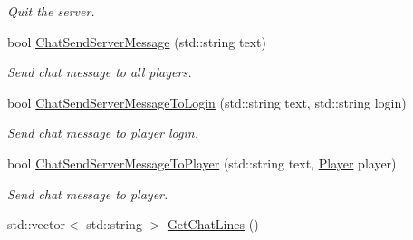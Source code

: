 \begin{DoxyCompactItemize}
\begin{DoxyCompactList}\small\item\em Quit the server. \end{DoxyCompactList}\item 
bool \hyperlink{classMethods_a5e639d7a4fa2e2b403dfa5adfbc47ac3}{Chat\-Send\-Server\-Message} (std\-::string text)
\begin{DoxyCompactList}\small\item\em Send chat message to all players. \end{DoxyCompactList}\item 
bool \hyperlink{classMethods_a200065ea89c2694f9d2af3aae686c483}{Chat\-Send\-Server\-Message\-To\-Login} (std\-::string text, std\-::string login)
\begin{DoxyCompactList}\small\item\em Send chat message to player login. \end{DoxyCompactList}\item 
bool \hyperlink{classMethods_a616887260c024c6b7cabcdca9d43fdec}{Chat\-Send\-Server\-Message\-To\-Player} (std\-::string text, \hyperlink{structPlayer}{Player} player)
\begin{DoxyCompactList}\small\item\em Send chat message to player. \end{DoxyCompactList}\item 
\hypertarget{classMethods_a8a5de3ccd3e56cba116c5c1159c91c11}{std\-::vector$<$ std\-::string $>$ \hyperlink{classMethods_a8a5de3ccd3e56cba116c5c1159c91c11}{Get\-Chat\-Lines} ()}\label{classMethods_a8a5de3ccd3e56cba116c5c1159c91c11}


\end{DoxyCompactItemize}
